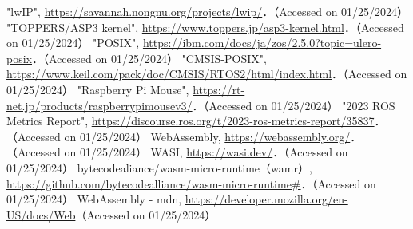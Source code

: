 \begin{thebibliography}{99}
 "lwIP", \url{https://savannah.nongnu.org/projects/lwip/}．（Accessed on 01/25/2024）
 "TOPPERS/ASP3 kernel", \url{https://www.toppers.jp/asp3-kernel.html}．（Accessed on 01/25/2024）
 "POSIX", \url{https://ibm.com/docs/ja/zos/2.5.0?topic=ulero-posix}．（Accessed on 01/25/2024）
 "CMSIS-POSIX", \url{https://www.keil.com/pack/doc/CMSIS/RTOS2/html/index.html}．（Accessed on 01/25/2024）
 "Raspberry Pi Mouse", \url{https://rt-net.jp/products/raspberrypimousev3/}．（Accessed on 01/25/2024）
 "2023 ROS Metrics Report", \url{https://discourse.ros.org/t/2023-ros-metrics-report/35837}．（Accessed on 01/25/2024）
 WebAssembly, \url{https://webassembly.org/}．（Accessed on 01/25/2024）
 WASI, \url{https://wasi.dev/}．（Accessed on 01/25/2024）
 bytecodealiance/wasm-micro-runtime（wamr）, \url{https://github.com/bytecodealliance/wasm-micro-runtime#}．（Accessed on 01/25/2024）
 WebAssembly - mdn, \url{https://developer.mozilla.org/en-US/docs/Web}（Accessed on 01/25/2024）
\end{thebibliography}